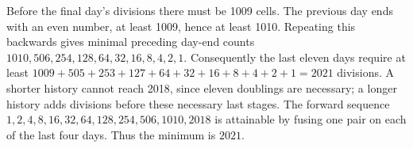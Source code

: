 Before the final day's divisions there must be 1009 cells. The previous day ends with an even number, at least 1009, hence at least 1010. Repeating this backwards gives minimal preceding day-end counts $1010,506,254,128,64,32,16,8,4,2,1$. Consequently the last eleven days require at least $1009+505+253+127+64+32+16+8+4+2+1=2021$ divisions. A shorter history cannot reach 2018, since eleven doublings are necessary; a longer history adds divisions before these necessary last stages. The forward sequence $1,2,4,8,16,32,64,128,254,506,1010,2018$ is attainable by fusing one pair on each of the last four days. Thus the minimum is $\boxed{2021}$.
